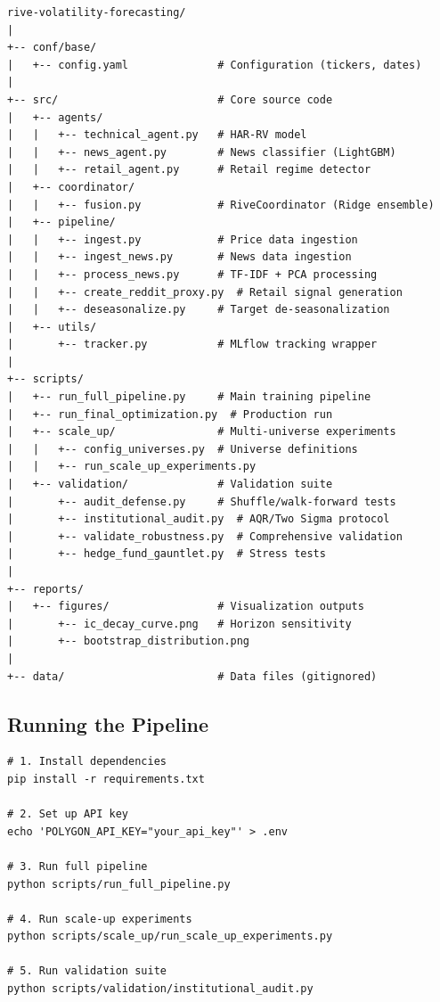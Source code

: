 \documentclass[12pt,a4paper]{article}
\begin{document}
\begin{lstlisting}
rive-volatility-forecasting/
|
+-- conf/base/
|   +-- config.yaml              # Configuration (tickers, dates)
|
+-- src/                         # Core source code
|   +-- agents/
|   |   +-- technical_agent.py   # HAR-RV model
|   |   +-- news_agent.py        # News classifier (LightGBM)
|   |   +-- retail_agent.py      # Retail regime detector
|   +-- coordinator/
|   |   +-- fusion.py            # RiveCoordinator (Ridge ensemble)
|   +-- pipeline/
|   |   +-- ingest.py            # Price data ingestion
|   |   +-- ingest_news.py       # News data ingestion
|   |   +-- process_news.py      # TF-IDF + PCA processing
|   |   +-- create_reddit_proxy.py  # Retail signal generation
|   |   +-- deseasonalize.py     # Target de-seasonalization
|   +-- utils/
|       +-- tracker.py           # MLflow tracking wrapper
|
+-- scripts/
|   +-- run_full_pipeline.py     # Main training pipeline
|   +-- run_final_optimization.py  # Production run
|   +-- scale_up/                # Multi-universe experiments
|   |   +-- config_universes.py  # Universe definitions
|   |   +-- run_scale_up_experiments.py
|   +-- validation/              # Validation suite
|       +-- audit_defense.py     # Shuffle/walk-forward tests
|       +-- institutional_audit.py  # AQR/Two Sigma protocol
|       +-- validate_robustness.py  # Comprehensive validation
|       +-- hedge_fund_gauntlet.py  # Stress tests
|
+-- reports/
|   +-- figures/                 # Visualization outputs
|       +-- ic_decay_curve.png   # Horizon sensitivity
|       +-- bootstrap_distribution.png
|
+-- data/                        # Data files (gitignored)
\end{lstlisting}

\subsection{Running the Pipeline}

\begin{lstlisting}
# 1. Install dependencies
pip install -r requirements.txt

# 2. Set up API key
echo 'POLYGON_API_KEY="your_api_key"' > .env

# 3. Run full pipeline
python scripts/run_full_pipeline.py

# 4. Run scale-up experiments
python scripts/scale_up/run_scale_up_experiments.py

# 5. Run validation suite
python scripts/validation/institutional_audit.py
\end{lstlisting}
\end{document}
